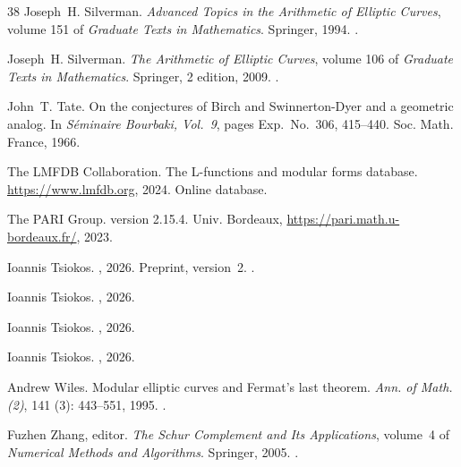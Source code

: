 \documentclass[11pt]{article}
\theoremstyle{definition}
\begin{document}
\begin{thebibliography}{38}
Joseph~H. Silverman.
\newblock \emph{Advanced Topics in the Arithmetic of Elliptic Curves}, volume 151 of \emph{Graduate Texts in Mathematics}.
\newblock Springer, 1994.
\newblock {}.

Joseph~H. Silverman.
\newblock \emph{The Arithmetic of Elliptic Curves}, volume 106 of \emph{Graduate Texts in Mathematics}.
\newblock Springer, 2 edition, 2009.
\newblock {}.

John~T. Tate.
\newblock On the conjectures of {Birch} and {Swinnerton-Dyer} and a geometric analog.
\newblock In \emph{S\'eminaire Bourbaki, Vol.~9}, pages Exp.~No.~306, 415--440. Soc. Math. France, 1966.

{The LMFDB Collaboration}.
\newblock The {L}-functions and modular forms database.
\newblock \url{https://www.lmfdb.org}, 2024.
\newblock Online database.

{The PARI Group}.
 version 2.15.4.
\newblock Univ. Bordeaux, \url{https://pari.math.u-bordeaux.fr/}, 2023.

Ioannis Tsiokos.
, 2026{}.
\newblock Preprint, version~2. .

Ioannis Tsiokos.
, 2026{}.

Ioannis Tsiokos.
, 2026{}.

Ioannis Tsiokos.
, 2026{}.

Andrew Wiles.
\newblock Modular elliptic curves and {Fermat's} last theorem.
\newblock \emph{Ann. of Math. (2)}, 141 (3): 443--551, 1995.
\newblock {}.

Fuzhen Zhang, editor.
\newblock \emph{The {Schur} Complement and Its Applications}, volume~4 of \emph{Numerical Methods and Algorithms}.
\newblock Springer, 2005.
\newblock {}.

\end{thebibliography}
 
\endgroup
\end{document}
